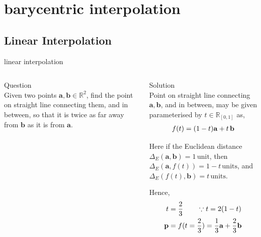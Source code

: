 \documentclass[aspectratio=169,xcolor={dvipsnames,svgnames}]{beamer}
\begin{document}
\section{barycentric interpolation}
\label{sec:orgf715ac8}

\subsection{Linear Interpolation}
\label{sec:org318cc43}

\begin{frame}[label={sec:orgeee1043}]{linear interpolation}
\begin{columns}
\begin{column}{.3\columnwidth}
\alert{Question} \\[0pt]
Given two points \(\mathbf{a},\mathbf{b} \in
\mathbb{R}^2\), find the point on straight line
connecting them, and in between, so that it is twice as
far away from \(\mathbf{b}\) as it is from \(\mathbf{a}\).
\end{column}

\begin{column}{.7\columnwidth}
\alert{Solution} \\[0pt]
Point on straight line connecting
\(\mathbf{a},\mathbf{b}\), and in between, may be given
parameterised by \(t\in\mathbb{R}_{[0,1]}\) as,
\begin{align}
  \notag
  f(t) = (1-t)\mathbf{a} + t\,\mathbf{b}
\end{align}

Here if the Euclidean distance \(\Delta_E (\mathbf{a},
\mathbf{b}) = 1\,\mathrm{unit}\), then \(\Delta_E
(\mathbf{a}, f(t)) = 1-t\,\mathrm{units}\), and
\(\Delta_E (f(t), \mathbf{b}) = t\,\mathrm{units}\).

Hence,
\begin{align}
  \notag
  t &= \frac23 \qquad \because t = 2(1-t) \\
  \notag
  \mathbf{p} &= f(t=\frac23) =
               \frac13\mathbf{a} + \frac23\mathbf{b}
\end{align}
\end{column}
\end{columns}
\end{frame}
\end{document}
